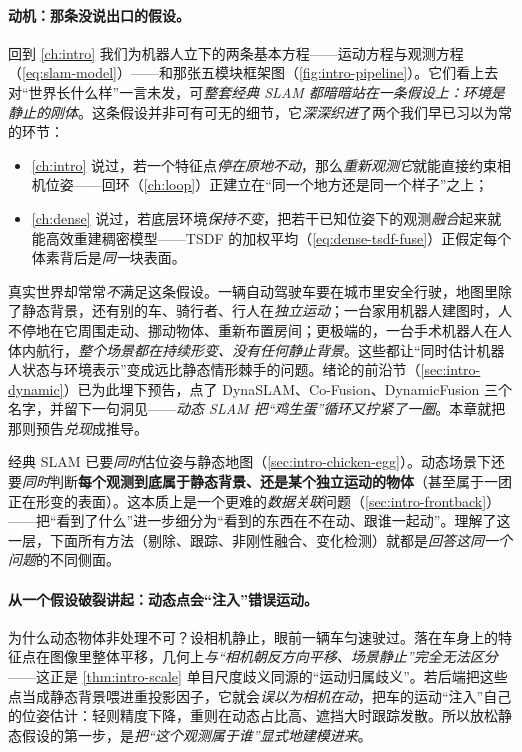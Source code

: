 \paragraph{动机：那条没说出口的假设。}
回到 \cref{ch:intro} 我们为机器人立下的两条基本方程——运动方程与观测方程（\cref{eq:slam-model}）——和那张五模块框架图（\cref{fig:intro-pipeline}）。它们看上去对“世界长什么样”一言未发，可\emph{整套经典 SLAM 都暗暗站在一条假设上：环境是静止的刚体}。这条假设并非可有可无的细节，它\emph{深深织进}了两个我们早已习以为常的环节\cite{schmid2026dynamic}：
\begin{itemize}
  \item \cref{ch:intro} 说过，若一个特征点\emph{停在原地不动}，那么\emph{重新观测它}就能直接约束相机位姿——回环（\cref{ch:loop}）正建立在“同一个地方还是同一个样子”之上；
  \item \cref{ch:dense} 说过，若底层环境\emph{保持不变}，把若干已知位姿下的观测\emph{融合}起来就能高效重建稠密模型——TSDF 的加权平均（\cref{eq:dense-tsdf-fuse}）正假定每个体素背后是\emph{同一}块表面。
\end{itemize}
真实世界却常常\emph{不}满足这条假设。一辆自动驾驶车要在城市里安全行驶，地图里除了静态背景，还有别的车、骑行者、行人在\emph{独立运动}；一台家用机器人建图时，人不停地在它周围走动、挪动物体、重新布置房间；更极端的，一台手术机器人在人体内航行，\emph{整个场景都在持续形变、没有任何静止背景}。这些都让“同时估计机器人状态与环境表示”变成远比静态情形棘手的问题。绪论的前沿节（\cref{sec:intro-dynamic}）已为此埋下预告，点了 DynaSLAM、Co-Fusion、DynamicFusion 三个名字，并留下一句洞见——\emph{动态 SLAM 把“鸡生蛋”循环又拧紧了一圈}。本章就把那则预告\emph{兑现}成推导。

\begin{insight}
经典 SLAM 已要\emph{同时}估位姿与静态地图（\cref{sec:intro-chicken-egg}）。动态场景下还要\emph{同时}判断\textbf{每个观测到底属于静态背景、还是某个独立运动的物体}（甚至属于一团正在形变的表面）。这本质上是一个更难的\emph{数据关联}问题（\cref{sec:intro-frontback}）——把“看到了什么”进一步细分为“看到的东西在不在动、跟谁一起动”。理解了这一层，下面所有方法（剔除、跟踪、非刚性融合、变化检测）就都是\emph{回答这同一个问题}的不同侧面。
\end{insight}

\paragraph{从一个假设破裂讲起：动态点会“注入”错误运动。}
为什么动态物体非处理不可？设相机静止，眼前一辆车匀速驶过。落在车身上的特征点在图像里整体平移，几何上\emph{与“相机朝反方向平移、场景静止”完全无法区分}——这正是 \cref{thm:intro-scale} 单目尺度歧义同源的“运动归属歧义”。若后端把这些点当成静态背景喂进重投影因子，它就会\emph{误以为相机在动}，把车的运动“注入”自己的位姿估计：轻则精度下降，重则在动态占比高、遮挡大时跟踪发散。所以放松静态假设的第一步，是\emph{把“这个观测属于谁”显式地建模进来}。

